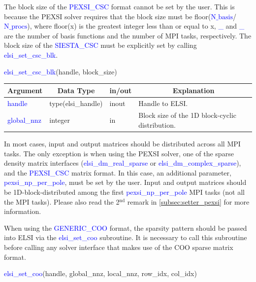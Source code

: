 \documentclass{report}
\begin{document}
The block size of the \textcolor{blue}{PEXSI\_CSC} format cannot be set by the user.  This is because the PEXSI solver requires that the block size must be floor(\textcolor{blue}{$\text{N}\_\text{basis}$}/\textcolor{blue}{$\text{N}\_\text{procs}$}), where floor(x) is the greatest integer less than or equal to x, \textcolor{blue}{\_} and \textcolor{blue}{\_} are the number of basis functions and the number of MPI tasks, respectively.  The block size of the \textcolor{blue}{SIESTA\_CSC} must be explicitly set by calling \textcolor{blue}{elsi\_set\_csc\_blk}.
\begin{labeling}{\hspace{6cm}}
\item [\hspace{0.3cm} \textcolor{blue}{elsi\_set\_csc\_blk}(handle, block\_size)]
\end{labeling}

\begin{tabular}[]{|p{30mm}|p{30mm}|p{15mm}|p{90mm}|}
\hline
\multicolumn{1}{|c|}{\textbf{Argument}} & \multicolumn{1}{c|}{\textbf{Data Type}} & \multicolumn{1}{c|}{\textbf{in/out}} & \multicolumn{1}{c|}{\textbf{Explanation}}\\
\hline
\textcolor{blue}{handle}       & type(elsi\_handle) & inout & Handle to ELSI.\\
\hline
\textcolor{blue}{global\_nnz}  & integer            & in    & Block size of the 1D block-cyclic distribution.\\
\hline
\end{tabular}

In most cases, input and output matrices should be distributed across all MPI tasks.  The only exception is when using the PEXSI solver, one of the sparse density matrix interfaces (\textcolor{blue}{elsi\_dm\_real\_sparse} or \textcolor{blue}{elsi\_dm\_complex\_sparse}), and the \textcolor{blue}{PEXSI\_CSC} matrix format.  In this case, an additional parameter, \textcolor{blue}{pexsi\_np\_per\_pole}, must be set by the user.  Input and output matrices should be 1D-block-distributed among the first \textcolor{blue}{pexsi\_np\_per\_pole} MPI tasks (not all the MPI tasks).  Please also read the 2$^\text{nd}$ remark in \ref{subsec:setter_pexsi} for more information.

When using the \textcolor{blue}{GENERIC\_COO} format, the sparsity pattern should be passed into ELSI via the \textcolor{blue}{elsi\_set\_coo} subroutine.  It is necessary to call this subroutine before calling any solver interface that makes use of the COO sparse matrix format.
\begin{labeling}{\hspace{6cm}}
\item [\hspace{0.3cm} \textcolor{blue}{elsi\_set\_coo}(handle, global\_nnz, local\_nnz, row\_idx, col\_idx)]
\end{labeling}
\end{document}
